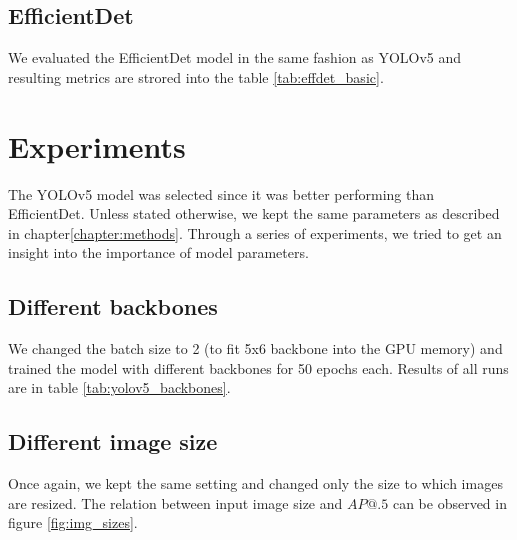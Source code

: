 \subsection{EfficientDet}
We evaluated the EfficientDet model in the same fashion as YOLOv5 and resulting metrics are strored into the table \ref{tab:effdet_basic}.


\section{Experiments}
The YOLOv5 model was selected since it was better performing than EfficientDet. Unless stated otherwise, we kept the same parameters as described in chapter\ref{chapter:methods}. Through a series of experiments, we tried to get an insight into the importance of model parameters.
\subsection{Different backbones}
We changed the batch size to 2 (to fit 5x6 backbone into the GPU memory) and trained the model with different backbones for 50 epochs each. Results of all runs are in table \ref{tab:yolov5_backbones}.


\subsection{Different image size}
Once again, we kept the same setting and changed only the size to which images are resized. The relation between input image size and $AP@.5$ can be observed in figure \ref{fig:img_sizes}.

